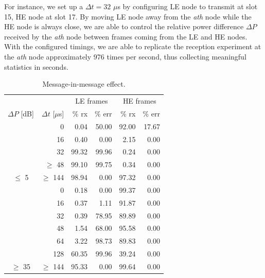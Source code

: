 \documentclass[twoside,nohyper]{tufte-book}
\begin{document}
For instance, we set up a \(\Delta t = 32\) \(\mu\)s by configuring LE node to transmit at slot 15, HE node at slot 17. By moving LE node away from the \emph{ath} node while the HE node is always close, we are able to control the relative power difference \(\Delta P\) received by the \emph{ath} node between frames coming from the LE and HE nodes. With the configured timings, we are able to replicate the reception experiment at the \emph{ath} node approximately 976 times per second, thus collecting meaningful statistics in seconds.

\begin{table}

\begin{center}
\begin{tabular}{crrrrr}
\toprule
\multicolumn{2}{c}{ } & \multicolumn{2}{c}{LE frames} & \multicolumn{2}{c}{HE frames} \\
\cmidrule(l{3pt}r{3pt}){3-4} \cmidrule(l{3pt}r{3pt}){5-6}
$\Delta P$ [dB] & $\Delta t$ [$\mu$s] & $\%$ rx & $\%$ err & $\%$ rx & $\%$ err\\
\midrule
 & 0 & 0.04 & 50.00 & 92.00 & 17.67\\

 & 16 & 0.40 & 0.00 & 2.15 & 0.00\\

 & 32 & 99.32 & 99.96 & 0.24 & 0.00\\

 & $\geq$ 48 & 99.10 & 99.75 & 0.34 & 0.00\\

\multirow{-5}{*}{\centering\arraybackslash $\leq$ 5} & $\geq$ 144 & 98.94 & 0.00 & 97.32 & 0.00\\
\cmidrule{1-6}
 & 0 & 0.18 & 0.00 & 99.37 & 0.00\\

 & 16 & 0.37 & 1.11 & 91.87 & 0.00\\

 & 32 & 0.39 & 78.95 & 89.89 & 0.00\\

 & 48 & 1.54 & 68.00 & 95.58 & 0.00\\

 & 64 & 3.22 & 98.73 & 89.83 & 0.00\\

 & 128 & 60.35 & 99.96 & 39.24 & 0.00\\

\multirow{-7}{*}{\centering\arraybackslash $\geq$ 35} & $\geq$ 144 & 95.33 & 0.00 & 99.64 & 0.00\\
\bottomrule
\end{tabular}
\end{center}
\caption{\label{tab:secondcapturet}Message-in-message effect.}
\end{table}
\end{document}

